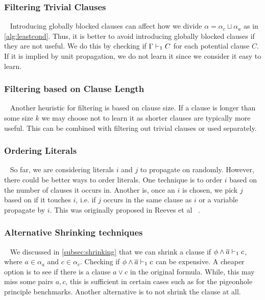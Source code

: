 


\subsubsection{Filtering Trivial Clauses}~\label{subsubsec:filteringtriv}
Introducing globally blocked clauses can affect how we divide $\alpha = \alpha_c
\sqcup \alpha_a$ as in \autoref{alg:leastcond}. Thus, it is better to avoid
introducing globally blocked clauses if they are not useful. We do this by
checking if $\Gamma \vdash_1 C$ for each potential clause $C$. If it is implied by
unit propagation, we do not learn it since we consider it easy to learn.

\subsubsection{Filtering based on Clause Length}~\label{subsubsec:filtering-length}
Another heuristic for filtering is based on clause size. If a clause is longer
than some size $k$ we may choose not to learn it as shorter clauses are
typically more useful. This can be combined with filtering out trivial clauses
or used separately.

\subsubsection{Ordering Literals}~\label{subsubsec:ordering-literals}
So far, we are considering literals $i$ and $j$ to propagate on randomly.
However, there could be better ways to order literals. One technique is to order
$i$ based on the number of clauses it occurs in. Another is, once an $i$ is
chosen, we pick $j$ based on if it touches $i$, i.e. if $j$ occurs in the same
clause as $i$ or a variable propagate by $i$. This was originally proposed in
Reeves et al ~\cite{prelearn}.

\subsubsection{Alternative Shrinking
techniques}~\label{subsubsec:shrink-techniques} We discussed in
\autoref{subsec:shrinking} that we can shrink a clause if
$\phi \land \overline{a} \vdash_1 c$, where $a \in \alpha_a$ and $c \in \alpha_c$.
Checking if $\phi \land \overline{a} \vdash_1 c$ can be expensive. A cheaper option is
to see if there is a clause $a \lor c$ in the original formula. While, this may
miss some pairs $a, c$, this is sufficient in certain cases such as for the
pigeonhole principle benchmarks. Another alternative is to not shrink the clause
at all.

